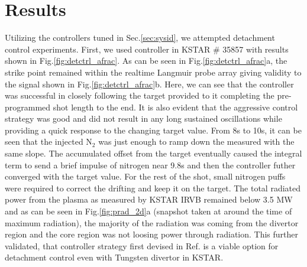 \section{Results}
\label{sec:results}





Utilizing the controllers tuned in Sec.\ref{sec:sysid}, we attempted detachment control experiments.
First, we used \Afrac controller in KSTAR \# 35857 with results shown in Fig.\ref{fig:detctrl_afrac}.
As can be seen in Fig.\ref{fig:detctrl_afrac}a, the strike point remained within the realtime Langmuir probe array giving validity to the \Afrac signal shown in Fig.\ref{fig:detctrl_afrac}b.
Here, we can see that the controller was successful in closely following the target provided to it completing the pre-programmed shot length to the end.
It is also evident that the aggressive control strategy was good and did not result in any long sustained oscillations while providing a quick response to the changing target value.
From 8s to 10s, it can be seen that the injected N$_2$ was just enough to ramp down the measured \Afrac with the same slope.
The accumulated offset from the target eventually caused the integral term to send a brief impulse of nitrogen near 9.8s and then the controller futher converged with the target value.
For the rest of the shot, small nitrogen puffs were required to correct the drifting \Afrac and keep it on the target.
The total radiated power from the plasma as measured by KSTAR \ac{IRVB} remained below 3.5 MW and as can be seen in Fig.\ref{fig:prad_2d}a (snapshot taken at around the time of maximum radiation), the majority of the radiation was coming from the divertor region and the core region was not loosing power through radiation.
This further validated, that \Afrac controller strategy first devised in Ref.\cite{Eldon_2022_PPCF} is a viable option for detachment control even with Tungsten divertor in KSTAR.

